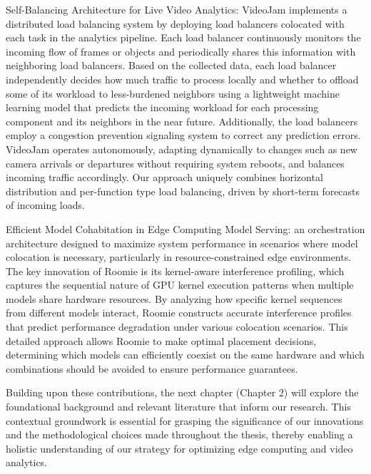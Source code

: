 Self-Balancing Architecture for Live Video Analytics: VideoJam implements a distributed load balancing system by deploying load balancers colocated with each task in the analytics pipeline. Each load balancer continuously monitors the incoming flow of frames or objects and periodically shares this information with neighboring load balancers. Based on the collected data, each load balancer independently decides how much traffic to process locally and whether to offload some of its workload to less-burdened neighbors using a lightweight machine learning model that predicts the incoming workload for each processing component and its neighbors in the near future. Additionally, the load balancers employ a congestion prevention signaling system to correct any prediction errors. VideoJam operates autonomously, adapting dynamically to changes such as new camera arrivals or departures without requiring system reboots, and balances incoming traffic accordingly. Our approach uniquely combines horizontal distribution and per-function type load balancing, driven by short-term forecasts of incoming loads.

Efficient Model Cohabitation in Edge Computing Model Serving: an orchestration architecture designed to maximize system performance in scenarios where model colocation is necessary, particularly in resource-constrained edge environments. The key innovation of Roomie is its kernel-aware interference profiling, which captures the sequential nature of GPU kernel execution patterns when multiple models share hardware resources. By analyzing how specific kernel sequences from different models interact, Roomie constructs accurate interference profiles that predict performance degradation under various colocation scenarios. This detailed approach allows Roomie to make optimal placement decisions, determining which models can efficiently coexist on the same hardware and which combinations should be avoided to ensure performance guarantees.

Building upon these contributions, the next chapter (Chapter 2) will explore the foundational background and relevant literature that inform our research. This contextual groundwork is essential for grasping the significance of our innovations and the methodological choices made throughout the thesis, thereby enabling a holistic understanding of our strategy for optimizing edge computing and video analytics.